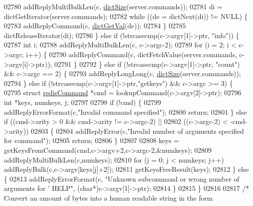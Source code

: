 \begin{DoxyCode}
{{{{{{{{{{{{{{{{{{{{{{{{{{{{{{{{{{02780         addReplyMultiBulkLen(c, \hyperlink{dict_8h_af193430dd3d5579a52b194512f72c1f0}{dictSize}(server.commands));
02781         di = dictGetIterator(server.commands);
02782         \textcolor{keywordflow}{while} ((de = dictNext(di)) != NULL) \{
02783             addReplyCommand(c, \hyperlink{dict_8h_ae8d2cc391873b2bea2b87c4f80f43120}{dictGetVal}(de));
02784         \}
02785         dictReleaseIterator(di);
02786     \} \textcolor{keywordflow}{else} \textcolor{keywordflow}{if} (!strcasecmp(c->argv[1]->ptr, \textcolor{stringliteral}{"info"})) \{
02787         \textcolor{keywordtype}{int} i;
02788         addReplyMultiBulkLen(c, c->argc-2);
02789         \textcolor{keywordflow}{for} (i = 2; i < c->argc; i++) \{
02790             addReplyCommand(c, dictFetchValue(server.commands, c->argv[i]->ptr));
02791         \}
02792     \} \textcolor{keywordflow}{else} \textcolor{keywordflow}{if} (!strcasecmp(c->argv[1]->ptr, \textcolor{stringliteral}{"count"}) && c->argc == 2) \{
02793         addReplyLongLong(c, \hyperlink{dict_8h_af193430dd3d5579a52b194512f72c1f0}{dictSize}(server.commands));
02794     \} \textcolor{keywordflow}{else} \textcolor{keywordflow}{if} (!strcasecmp(c->argv[1]->ptr,\textcolor{stringliteral}{"getkeys"}) && c->argc >= 3) \{
02795         \textcolor{keyword}{struct} \hyperlink{structredisCommand}{redisCommand} *cmd = lookupCommand(c->argv[2]->ptr);
02796         \textcolor{keywordtype}{int} *keys, numkeys, j;
02797 
02798         \textcolor{keywordflow}{if} (!cmd) \{
02799             addReplyErrorFormat(c,\textcolor{stringliteral}{"Invalid command specified"});
02800             \textcolor{keywordflow}{return};
02801         \} \textcolor{keywordflow}{else} \textcolor{keywordflow}{if} ((cmd->arity > 0 && cmd->arity != c->argc-2) ||
02802                    ((c->argc-2) < -cmd->arity))
02803         \{
02804             addReplyError(c,\textcolor{stringliteral}{"Invalid number of arguments specified for command"});
02805             \textcolor{keywordflow}{return};
02806         \}
02807 
02808         keys = getKeysFromCommand(cmd,c->argv+2,c->argc-2,&numkeys);
02809         addReplyMultiBulkLen(c,numkeys);
02810         \textcolor{keywordflow}{for} (j = 0; j < numkeys; j++) addReplyBulk(c,c->argv[keys[j]+2]);
02811         getKeysFreeResult(keys);
02812     \} \textcolor{keywordflow}{else} \{
02813         addReplyErrorFormat(c, \textcolor{stringliteral}{"Unknown subcommand or wrong number of arguments for '%
       HELP"}, (\textcolor{keywordtype}{char}*)c->argv[1]->ptr);
02814     \}
02815 \}
02816 
02817 \textcolor{comment}{/* Convert an amount of bytes into a human readable string in the form}
}}}}}}}}}}}}}}}}}}}}}}}}}}}}}}}}}}
\end{DoxyCode}
